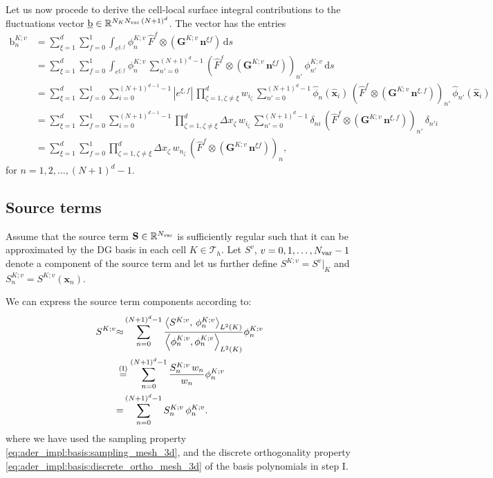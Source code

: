 \documentclass{scrreprt}
\theoremstyle{definition}
\theoremstyle{nonumberplain}
\renewcommand{\vec}[1]{{\textbf{#1}}}
\newcommand{\laVec}[1]{\underline{\mathrm{#1}}}
\newcommand{\laVecel}[1]{\mathrm{#1}}
\newcommand{\tria}{\mathcal{T}_h}
\newcommand{\cell}{K}
\newcommand{\face}{e}
\newcommand{\ds}{\text{d}s}
\newcommand{\refVec}[1]{\hat{\vec{#1}}}
\begin{document}
Let us now procede to derive the cell-local surface integral contributions to
the fluctuations vector $\laVec{b}\in \mathbb{R}^{N_\cell
N_\textup{var}\,(N+1)^d}$.
The vector has the entries
\begin{align*}
\laVecel{b}^{\cell;v}_n &=
\sum_{\xi=1}^{d}
\sum_{f=0}^{1}
\int_{\face^{\xi, f}} {\phi}^{K;v}_{n}\,
\hat{F}^f\otimes(\vec{G}^{\cell;v}\,\vec{n}^{\xi
f})
\,\ds
\\
&=
\sum_{\xi=1}^{d}
\sum_{f=0}^{1}
\int_{\face^{\xi, f}} {\phi}^{K;v}_{n}\,
\sum_{n'=0}^{(N+1)^{d}-1}
(\hat{F}^f\otimes(\vec{G}^{\cell;v}\,\vec{n}^{\xi
f}))_{n'}
\,
{\phi}^{K;v}_{n'}\,\ds
\\
&=
\sum_{\xi=1}^{d}
\sum_{f=0}^{1}
\sum_{i=0}^{(N+1)^{d-1}-1}
|e^{\xi, f}|\,
\prod_{\zeta=1,\zeta\neq\xi}^d
w_{i_\zeta}\,
\sum_{n'=0}^{(N+1)^{d}-1}
\hat{\phi}_{n}(\refVec{x}_i)\,
(\hat{F}^f\otimes(\vec{G}^{\cell;v}\,\vec{n}^{\xi,f}))_{n'}
\,
\hat{\phi}_{n'}(\refVec{x}_i)
\\
&=
\sum_{\xi=1}^{d}
\sum_{f=0}^{1}
\sum_{i=0}^{(N+1)^{d-1}-1}
\prod_{\zeta=1,\zeta\neq\xi}^d
\Delta x_{\zeta}\,
w_{i_\zeta}\,
\sum_{n'=0}^{(N+1)^{d}-1}
\delta_{n i}\,
(\hat{F}^f\otimes(\vec{G}^{\cell;v}\,\vec{n}^{\xi,
f}))_{n'}
\,
\delta_{n' i}
\\
&=
\sum_{\xi=1}^{d}
\sum_{f=0}^{1}
\prod_{\zeta=1,\zeta\neq\xi}^d
\Delta x_{\zeta}\,
w_{n_\zeta}\,
(\hat{F}^f\otimes(\vec{G}^{\cell;v}\,\vec{n}^{\xi
f}))_{n},
\end{align*}
for $n=1,2,\ldots,(N+1)^{d}-1$.
\subsection{Source terms}
Assume that the source term $\textbf{S}\in\mathbb{R}^{N_\textup{var}}$
is sufficiently regular such that it can be approximated by the DG basis in each
cell $\cell\in\tria$.
Let $S^v$, $v=0,1,\ldots,N_\textup{var}-1$ denote a component of the source term
and let us further define $S^{\cell;v} = S^v|_\cell$
and $S^{\cell;v}_n = S^{\cell;v}(\vec{x}_n)$.

We can express the source term components according to:
\begin{align*}
S^{\cell;v}
&{\approx}
\sum_{n=0}^{(N+1)^d-1}
\frac
{
\left\langle S^{\cell;v},\,{\phi}^{\cell;v}_{n}
\right\rangle_{L^2(\cell)}
}
{
\left\langle{\phi}^{\cell;v}_{n},{\phi}^{\cell;v}_{n}
\right\rangle_{L^2(\cell)}
}
{\phi}^{\cell;v}_{n}
\\
&\overset{\textup{(I)}}{=}
\sum_{n=0}^{(N+1)^d-1}
\frac
{
S^{\cell;v}_{n}\,w_{n}
}
{
w_{n}
}
{\phi}^{\cell;v}_{n}
\\
&{=}
\sum_{n=0}^{(N+1)^d-1}
S^{\cell;v}_{n}\,\phi^{\cell;v}_{n}.
\end{align*}
where we have used the sampling property
\eqref{eq:ader_impl:basis:sampling_mesh_3d}, and
the discrete orthogonality property
\eqref{eq:ader_impl:basis:discrete_ortho_mesh_3d}
of the basis polynomials in step I.
\end{document}
